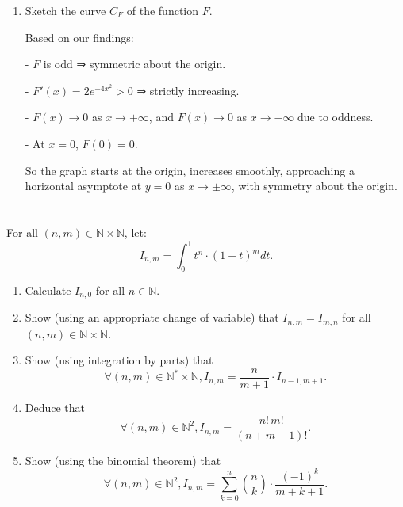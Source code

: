 \documentclass[12pt]{article}
\begin{document}
\begin{answerbox}
\begin{enumerate}
    \item Sketch the curve $ C_F $ of the function $ F $.

    Based on our findings:
    
        
- $ F $ is odd ⇒ symmetric about the origin.
        
- $ F'(x) = 2e^{-4x^2} > 0 $ ⇒ strictly increasing.
        
- $ F(x) \to 0 $ as $ x \to +\infty $, and $ F(x) \to 0 $ as $ x \to -\infty $ due to oddness.
        
- At $ x = 0 $, $ F(0) = 0 $.
    

    So the graph starts at the origin, increases smoothly, approaching a horizontal asymptote at $ y = 0 $ as $ x \to \pm\infty $, with symmetry about the origin.

\end{enumerate}
\end{answerbox}

\newpage

\section{}
For all $(n, m) \in \mathbb{N} \times \mathbb{N}$, let:
$$I_{n,m} = \int_{0}^{1} t^n \cdot (1-t)^m dt.$$

\begin{enumerate}
\item Calculate $I_{n,0}$ for all $n \in \mathbb{N}$.
\item Show (using an appropriate change of variable) that $I_{n,m} = I_{m,n}$ for all $(n, m) \in \mathbb{N} \times \mathbb{N}$.
\item Show (using integration by parts) that
$$\forall (n, m) \in \mathbb{N}^* \times \mathbb{N}, I_{n,m} = \frac{n}{m+1} \cdot I_{n-1,m+1}.$$
\item Deduce that
$$\forall (n, m) \in \mathbb{N}^2, I_{n,m} = \frac{n! \, m!}{(n+m+1)!}.$$
\item Show (using the binomial theorem) that
$$\forall (n, m) \in \mathbb{N}^2, I_{n,m} = \sum_{k=0}^{n} \binom{n}{k} \cdot \frac{(-1)^k}{m+k+1}.$$
\end{enumerate}

\newpage
\end{document}
